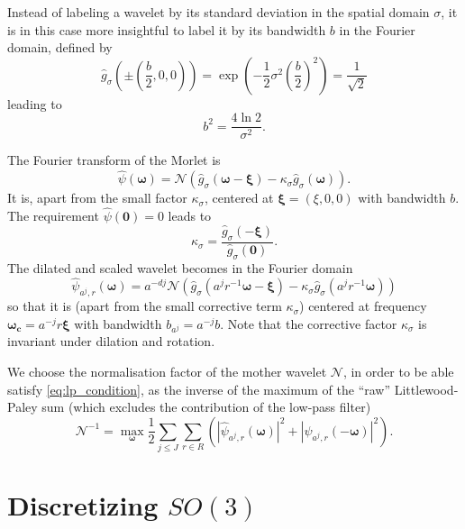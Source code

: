 \documentclass[twocolumn, openany, oneside, article]{memoir}
\begin{document}
Instead of labeling a wavelet by its standard deviation in the spatial domain $\sigma$, it is in this case
more insightful to label it by its bandwidth $b$ in the Fourier domain, defined by
\begin{equation}
  \hat{g}_{\sigma}\left(\pm \left(\frac{b}{2}, 0, 0 \right) \right) = \exp \left( -\frac{1}{2}\sigma^2 \left(\frac{b}{2}\right)^2 \right) = \frac{1}{\sqrt{2}}
\end{equation}
leading to
\begin{equation}
  b^2 = \frac{4 \ln 2}{\sigma^2}.
\end{equation}

The Fourier transform of the Morlet is
\begin{equation}
  \hat{\psi}(\bm{\omega}) = \mathcal{N} \left( \hat{g}_{\sigma}(\bm{\omega} - \bm{\xi}) -
  \kappa_{\sigma}\hat{g}_{\sigma}(\bm{\omega}) \right) .
\end{equation}
It is, apart from the small factor $\kappa_{\sigma}$, centered at
$\bm{\xi} = (\xi, 0, 0)$ with bandwidth $b$.
The requirement $\hat{\psi}(\bm{0}) = 0$ leads to
\begin{equation}
  \kappa_{\sigma} = \frac{\hat{g}_{\sigma}(-\bm{\xi})}{\hat{g}_{\sigma}(\bm{0})}.
\end{equation}
The dilated and scaled wavelet becomes in the Fourier domain
\begin{equation}
  \hat{\psi}_{a^j, r}(\bm{\omega}) = a^{-dj} \mathcal{N} \left( \hat{g}_{\sigma}(a^j r^{-1} \bm{\omega} - \bm{\xi}) - \kappa_{\sigma}\hat{g}_{\sigma}(a^j r^{-1} \bm{\omega}) \right)
\end{equation}
so that it is (apart from the small corrective term $\kappa_{\sigma}$) centered at frequency $\bm{\omega_c} =
a^{-j}r\bm{\xi}$ with bandwidth $b_{a^j} = a^{-j}b$. Note that the corrective factor $\kappa_{\sigma}$ is invariant
under dilation and rotation.

We choose the normalisation factor of the mother wavelet $\mathcal{N}$,
in order to be able satisfy \autoref{eq:lp_condition}, as the inverse of the maximum of the \enquote{raw} Littlewood-Paley
sum (which excludes the contribution of the low-pass filter)
\begin{equation}
  \mathcal{N}^{-1} = \max_{\bm{\omega}} \frac{1}{2} \sum_{j \leq J} \sum_{r \in R}
  \left( \left| \hat{\psi}_{a^j, r}(\bm{\omega}) \right|^2 + \left| \hat{\psi}_{a^j, r}(\bm{-\omega}) \right|^2
  \right).
\end{equation}


\section{Discretizing $SO(3)$}
\end{document}
